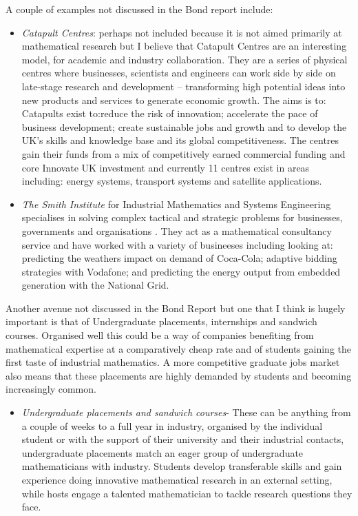 \documentclass[11pt]{article} %
\begin{document}
A couple of examples not discussed in the Bond report include:
\begin{itemize}
	\item \textit{Catapult Centres}: perhaps not included because it is not aimed primarily at mathematical research but I believe that Catapult Centres are an interesting model, for academic and industry collaboration. They are a series of physical centres where  businesses, scientists and engineers can work side by side on late-stage research and development – transforming high potential ideas into new products and services to generate economic growth.  The aims is to:  Catapults exist to:reduce the risk of innovation; 	accelerate the pace of business development;  create sustainable jobs and growth and to	develop the UK’s skills and knowledge base and its global competitiveness. The centres gain their funds from a mix of competitively earned commercial funding and core Innovate UK investment and currently 11 centres exist in areas including: energy systems, transport systems and satellite applications. 
	\item \textit{The Smith Institute} for Industrial Mathematics and Systems Engineering specialises in solving complex tactical and strategic problems for businesses, governments and organisations \cite{Smith}. They act as a mathematical consultancy service and have worked with a variety of busineeses including looking at:  predicting the weathers impact on demand of Coca-Cola; adaptive bidding strategies with Vodafone; and predicting the energy output from embedded generation with the National Grid. 
\end{itemize}
Another avenue not discussed in the Bond Report but one that I think is hugely important is that of Undergraduate placements, internships and sandwich courses. Organised well this could be a way of companies benefiting from mathematical expertise at a comparatively cheap rate and of students gaining the first taste of industrial mathematics. A more competitive graduate jobs market also means that these placements are highly demanded by students and becoming increasingly common. 
\begin{itemize}
	\item \textit{Undergraduate placements and sandwich courses}- These can be anything from a couple of weeks to a full year in industry, organised by the individual student or with the support of their university and their industrial contacts, undergraduate placements match an eager group of undergraduate mathematicians with industry. Students develop transferable skills and gain experience doing innovative mathematical research in an external setting, while hosts engage a talented mathematician to tackle research questions they face.
\end{itemize}
\end{document}
